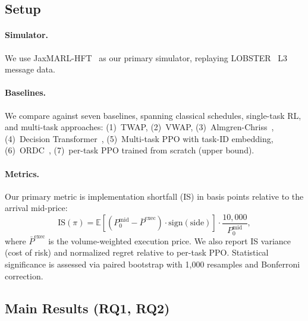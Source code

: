 \documentclass[sigconf,review,anonymous]{acmart}
\newcommand{\E}{\mathbb{E}}
\newcommand{\is}{\text{IS}}
\begin{document}

\subsection{Setup}

\paragraph{Simulator.}
We use JaxMARL-HFT~\cite{mohl2025jaxmarl} as our primary simulator, replaying LOBSTER~\cite{huang2011lobster} L3 message data.

\paragraph{Baselines.}
We compare against seven baselines, spanning classical schedules, single-task RL, and multi-task approaches:
(1)~TWAP,
(2)~VWAP,
(3)~Almgren-Chriss~\cite{almgren2001optimal},
(4)~Decision Transformer~\cite{chen2021decision},
(5)~Multi-task PPO with task-ID embedding,
(6)~ORDC~\cite{zhang2023towards},
(7)~per-task PPO trained from scratch (upper bound).

\paragraph{Metrics.}
Our primary metric is implementation shortfall (IS) in basis points relative to the arrival mid-price:
\begin{equation}
    \is(\pi) = \E\left[(P^{\text{mid}}_0 - \bar{P}^{\text{exec}}) \cdot \text{sign}(\text{side})\right] \cdot \frac{10{,}000}{P^{\text{mid}}_0},
\end{equation}
where $\bar{P}^{\text{exec}}$ is the volume-weighted execution price.
We also report IS variance (cost of risk) and normalized regret relative to per-task PPO.
Statistical significance is assessed via paired bootstrap with 1{,}000 resamples and Bonferroni correction.

\subsection{Main Results (RQ1, RQ2)}

\end{document}
